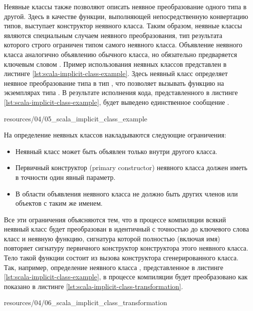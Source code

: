 Неявные классы также позволяют описать неявное преобразование одного типа в другой. Здесь в качестве функции, выполняющей непосредственную конвертацию типов, выступает конструктор неявного класса. Таким образом, неявные классы являются специальным случаем неявного преобразования, тип результата которого строго ограничен типом самого неявного класса. Объявление неявного класса аналогично объявлению обычного класса, но обязательно предваряется ключевым словом . Пример использования неявных классов представлен в листинге \ref{lst:scala-implicit-class-example}. Здесь неявный класс  определяет неявное преобразование типа  в тип , что позволяет вызывать функцию  на экземплярах типа . В результате исполнения кода, представленного в листинге \ref{lst:scala-implicit-class-example}, будет выведено единственное сообщение .


{resources/04/05_scala_implicit_class_example}

На определение неявных классов накладываются следующие ограничения:
\begin{itemize}
	\item Неявный класс может быть объявлен только внутри другого класса.
	\item Первичный конструктор (primary constructor) неявного класса должен иметь в точности один явный параметр.
	\item В области объявления неявного класса не должно быть других членов или объектов с таким же именем.
\end{itemize}
Все эти ограничения объясняются тем, что в процессе компиляции всякий неявный класс будет преобразован в идентичный с точностью до ключевого слова  класс и неявную функцию, сигнатура которой полностью (включая имя) повторяет сигнатуру первичного конструктор конструктора этого неявного класса. Тело такой функции состоит из вызова конструктора сгенерированного класса. Так, например, определение неявного класса , представленное в листинге \ref{lst:scala-implicit-class-example}, в процессе компиляции будет преобразовано как показано в листинге \ref{lst:scala-implicit-class-transformation}.


{resources/04/06_scala_implicit_class_transformation}

